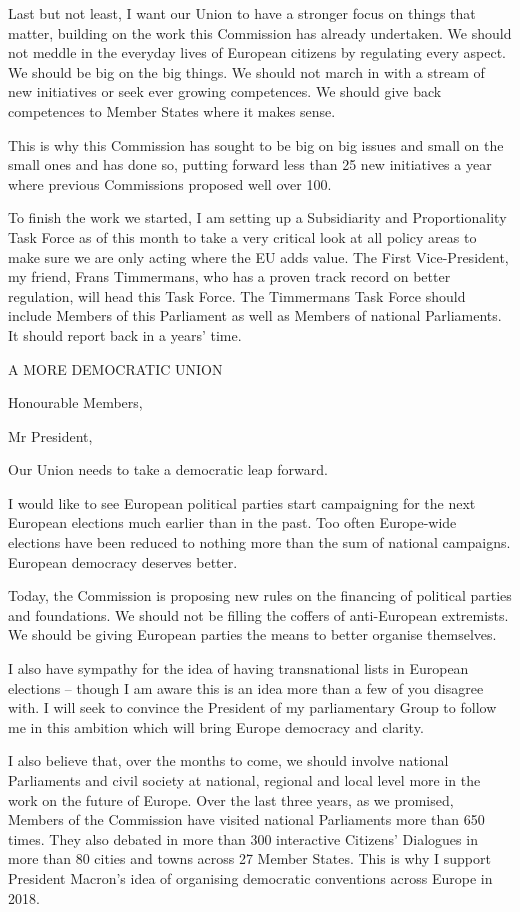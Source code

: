 \documentclass[a4paper,11pt]{article}
\begin{document}
 

Last but not least, I want our Union to have a stronger focus on things that matter, building on the work this Commission has already undertaken. We should not meddle in the everyday lives of European citizens by regulating every aspect. We should be big on the big things. We should not march in with a stream of new initiatives or seek ever growing competences. We should give back competences to Member States where it makes sense.

This is why this Commission has sought to be big on big issues and small on the small ones and has done so, putting forward less than 25 new initiatives a year where previous Commissions proposed well over 100.

To finish the work we started, I am setting up a Subsidiarity and Proportionality Task Force as of this month to take a very critical look at all policy areas to make sure we are only acting where the EU adds value. The First Vice-President, my friend, Frans Timmermans, who has a proven track record on better regulation, will head this Task Force. The Timmermans Task Force should include Members of this Parliament as well as Members of national Parliaments. It should report back in a years' time.

 

A MORE DEMOCRATIC UNION

Honourable Members,

Mr President,

Our Union needs to take a democratic leap forward.

I would like to see European political parties start campaigning for the next European elections much earlier than in the past. Too often Europe-wide elections have been reduced to nothing more than the sum of national campaigns. European democracy deserves better.

Today, the Commission is proposing new rules on the financing of political parties and foundations. We should not be filling the coffers of anti-European extremists. We should be giving European parties the means to better organise themselves.

I also have sympathy for the idea of having transnational lists in European elections – though I am aware this is an idea more than a few of you disagree with. I will seek to convince the President of my parliamentary Group to follow me in this ambition which will bring Europe democracy and clarity.

I also believe that, over the months to come, we should involve national Parliaments and civil society at national, regional and local level more in the work on the future of Europe. Over the last three years, as we promised, Members of the Commission have visited national Parliaments more than 650 times. They also debated in more than 300 interactive Citizens' Dialogues in more than 80 cities and towns across 27 Member States. This is why I support President Macron's idea of organising democratic conventions across Europe in 2018.
\end{document}

